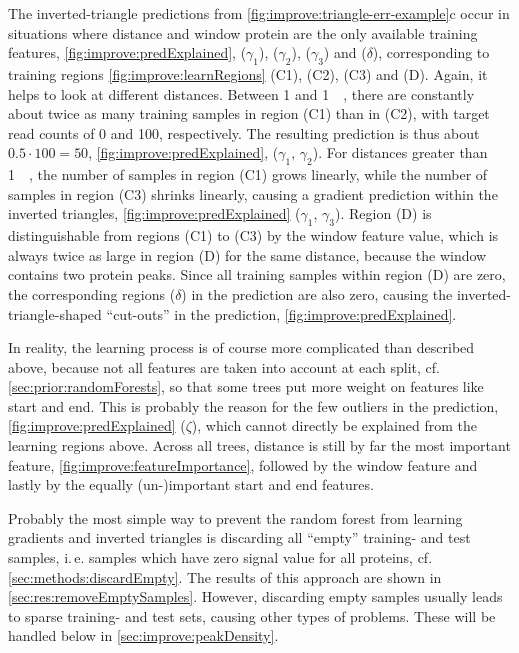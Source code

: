 The inverted-triangle predictions from \autoref{fig:improve:triangle-err-example}c occur in situations 
where distance and window protein are the only available training features, 
\autoref{fig:improve:predExplained}, ($\gamma_1$), ($\gamma_2$), ($\gamma_3$) and ($\delta$),
corresponding to training regions \autoref{fig:improve:learnRegions} (C1), (C2), (C3) and (D).
Again, it helps to look at different distances. Between \SI{1}{\bp} and \SI{1}{\mega\bp},
there are constantly about twice as many training samples
in region (C1) than in (C2), with target read counts of 0 and 100, respectively. 
The resulting prediction is thus about $0.5\cdot100 = 50$, \autoref{fig:improve:predExplained}, ($\gamma_1,\,\gamma_2$). 
For distances greater than \SI{1}{\mega\bp}, the number of samples in region (C1) grows linearly, 
while the number of samples in region (C3) shrinks linearly, causing a gradient prediction within the inverted triangles, 
\autoref{fig:improve:predExplained} ($\gamma_1$, $\gamma_3$).
Region (D) is distinguishable from regions (C1) to (C3) by the window feature value, 
which is always twice as large in region (D) for the same distance, because the window contains two protein peaks.
Since all training samples within region (D) are zero, 
the corresponding regions ($\delta$) in the prediction are also zero,
causing the inverted-triangle-shaped ``cut-outs'' in the prediction, \autoref{fig:improve:predExplained}.

In reality, the learning process is of course more complicated than described above, 
because not all features are taken into account at each split, cf.\;\autoref{sec:prior:randomForests}, 
so that some trees put more weight on features like start and end.
This is probably the reason for the few outliers in the prediction, \autoref{fig:improve:predExplained} ($\zeta$), 
which cannot directly be explained from the learning regions above.
Across all trees, distance is still by far the most important feature, \autoref{fig:improve:featureImportance},
followed by the window feature and lastly by the equally (un-)important start and end features.

Probably the most simple way to prevent the random forest from learning gradients and inverted triangles 
is discarding all ``empty'' training- and test samples, i.\,e. samples which have zero signal value for all proteins, cf.\;\autoref{sec:methods:discardEmpty}.
The results of this approach are shown in \autoref{sec:res:removeEmptySamples}.
However, discarding empty samples usually leads to sparse training- and test sets, causing other types of problems.
These will be handled below in \autoref{sec:improve:peakDensity}.

